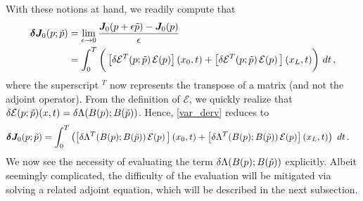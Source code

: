 With these notions at hand, we readily compute that
\begin{equation}\label{var_derv}
\begin{split}
    \bm{\delta J}_0(p;\tilde{p}) 
    & = \lim_{\epsilon \rightarrow 0} \frac{\bm{J}_0(p+\epsilon \tilde{p}) - \bm{J}_0(p)}{\epsilon} \\
   & = \int_0^T  \bigg(\left[\delta\mathcal{E}^T (p;\tilde{p}) \, \mathcal{E} (p)   \right](x_0,t)
    + \left[\delta\mathcal{E}^T (p;\tilde{p}) \,  \mathcal{E} (p) \,  \right](x_L,t)\bigg) \ dt \,,
\end{split}
\end{equation}
where the superscript $^T$ now represents the transpose of a matrix (and not the adjoint operator).
From the definition of $\mathcal{E}$, we quickly realize that $\delta\mathcal{E}(p;\tilde{p})(x,t) = \delta\Lambda (B(p);B(\tilde{p}))$. Hence, \eqref{var_derv} reduces to
\begin{equation}\label{var_derv3}
\begin{split}
      \bm{\delta J}_0(p;\tilde{p}) & = \int_0^T   \left(\left[\delta\Lambda^T (B(p);B(\tilde{p})) \, \mathcal{E} (p) \, \right](x_0,t)
    + \left[\delta\Lambda^T (B(p);B(\tilde{p})) \, \mathcal{E} (p) \right](x_L,t)\right) \ dt \,.
\end{split}
\end{equation}
We now see the necessity of evaluating the term $\delta\Lambda (B(p);B(\tilde{p})) $ explicitly. Albeit seemingly complicated, the difficulty of the evaluation will be mitigated via solving a related adjoint equation, which will be described in the next subsection.


